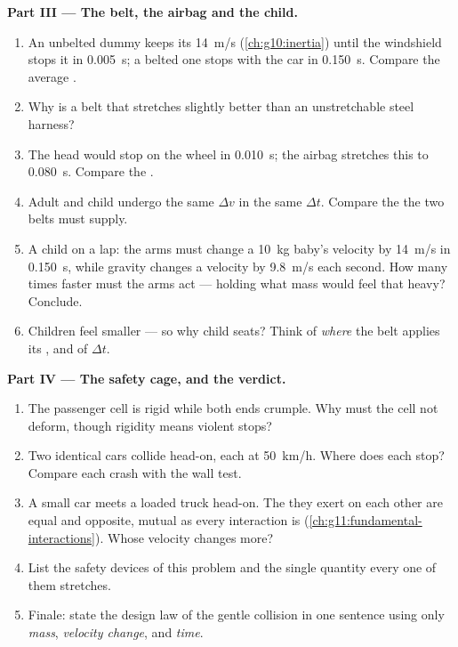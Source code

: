 \begin{problem}
\medskip
\noindent\textbf{Part III --- The belt, the airbag and the child.}
\begin{enumerate}[resume]
  \item An unbelted dummy keeps its \qty{14}{m/s} (\cref{ch:g10:inertia})
        until the windshield stops it in \qty{0.005}{s}; a belted one
        stops with the car in \qty{0.150}{s}. Compare the average .
  \item Why is a belt that stretches slightly better than an
        unstretchable steel harness?
  \item The head would stop on the wheel in \qty{0.010}{s}; the airbag
        stretches this to \qty{0.080}{s}. Compare the .
  \item Adult and child undergo the same $\Delta v$ in the same
        $\Delta t$. Compare the  the two belts must supply.
  \item A child on a lap: the arms must change a \qty{10}{kg} baby's
        velocity by \qty{14}{m/s} in \qty{0.150}{s}, while gravity
        changes a velocity by \qty{9.8}{m/s} each second. How many times
        faster must the arms act --- holding what mass would feel that
        heavy? Conclude.
  \item Children feel smaller  --- so why child seats? Think of
        \emph{where} the belt applies its , and of $\Delta t$.
\end{enumerate}

\medskip
\noindent\textbf{Part IV --- The safety cage, and the verdict.}
\begin{enumerate}[resume]
  \item The passenger cell is rigid while both ends crumple. Why must
        the cell not deform, though rigidity means violent stops?
  \item Two identical cars collide head-on, each at \qty{50}{km/h}.
        Where does each stop? Compare each crash with the wall test.
  \item A small car meets a loaded truck head-on. The  they exert
        on each other are equal and opposite, mutual as every interaction
        is (\cref{ch:g11:fundamental-interactions}). Whose velocity
        changes more?
  \item List the safety devices of this problem and the single quantity
        every one of them stretches.
  \item Finale: state the design law of the gentle collision in one
        sentence using only \emph{mass}, \emph{velocity change},
        \emph{} and \emph{time}.
\end{enumerate}
\end{problem}
